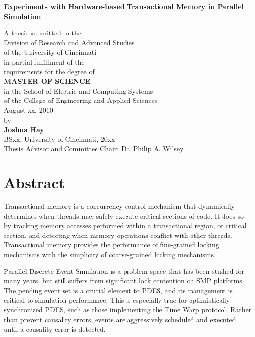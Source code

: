 \documentclass[11pt]{book}
\begin{document}
\thispagestyle{empty}

\doublespacing

\vspace*{0.5in}

\begin{center}
\LARGE{\textbf{Experiments with Hardware-based Transactional Memory in Parallel Simulation}}

\vspace*{0.4in}

  {\large A thesis submitted to the\\[0.20in]
    Division of Research and Advanced Studies\\
    of the University of Cincinnati\\[0.20in]
    in partial fulfillment of the\\
    requirements for the degree of\\[0.20in]
    {\bf MASTER OF SCIENCE}\\[0.20in]
    in the School of Electric and Computing Systems\\
    of the College of Engineering and Applied Sciences\\[0.20in]
    August xx, 2010\\[0.20in]
    by\\[0.20in]
    {\bf Joshua Hay}\\
    BSxx, University of Cincinnati, 20xx\\}
  \vspace{0.5in}
  {\large Thesis Advisor and Committee Chair:  Dr. Philip A. Wilsey}
\end{center}

\clearpage

\setcounter{page}{1}
\clearpage

\chapter*{Abstract} 

Transactional memory is a concurrency control mechanism that dynamically determines when
threads may safely execute critical sections of code.  It does so by tracking memory
accesses performed within a transactional region, or critical section, and detecting when
memory operations conflict with other threads.  Transactional memory provides the
performance of fine-grained locking mechanisms with the simplicity of coarse-grained
locking mechanisms.

Parallel Discrete Event Simulation is a problem space that has been studied for many
years, but still suffers from significant lock contention on SMP platforms.  The pending
event set is a crucial element to PDES, and its management is critical to simulation
performance.  This is especially true for optimistically synchronized PDES, such as those
implementing the Time Warp protocol.  Rather than prevent causality errors, events are
aggressively scheduled and executed until a causality error is detected.
\end{document}
